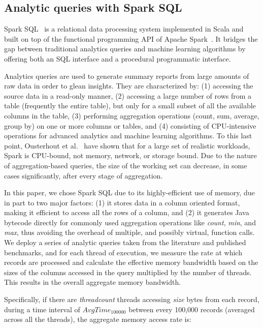 \documentclass[9pt]{sig-alternate-05-2015}
\begin{document}
\subsection{Analytic queries with Spark SQL}
\label{sec:sparksql}

Spark SQL~\cite{Armbrust:2015:SSR:2723372.2742797} is a relational data
processing system implemented in Scala and built on top of the functional
programming API of Apache Spark~\cite{Zaharia:2010:SCC:1863103.1863113}. It
bridges the gap between traditional analytics queries and machine
learning algorithms by offering both an SQL interface and a procedural
programmatic interface.

Analytics queries are used to generate summary reports from large amounts of
raw data in order to glean insights. They are characterized by: (1) accessing
the source data in a read-only manner, (2) accessing a large number of rows
from a table (frequently the entire table), but only for a small subset of all
the available columns in the table, (3) performing aggregation operations
(count, sum, average, group by) on one or more columns or tables, and (4)
consisting of CPU-intensive operations for advanced analytics and machine
learning algorithms.  To this last point, Ousterhout et
al.~\cite{Ousterhout:2015:MSP:2789770.2789791} have shown that for a large set
of realistic workloads, Spark is CPU-bound, not memory, network, or storage
bound.  Due to the nature of aggregation-based queries, the size of the working
set can decrease, in some cases significantly, after every stage of
aggregation.

In this paper, we chose Spark SQL due to its highly-efficient use of memory,
due in part to two major factors: (1) it stores data in a column oriented
format, making it efficient to access all the rows of a column, and (2) it
generates Java bytecode directly for commonly used aggregation operations like
{\em count}, {\em min}, and {\em max}, thus avoiding the overhead of multiple,
and possibly virtual, function calls.  We deploy a series of analytic queries
taken from the literature and published benchmarks, and for each thread of
execution, we measure the rate at which records are processed and calculate the
effective memory bandwidth based on the sizes of the columns accessed in the
query multiplied by the number of threads.  This results in the overall
aggregate memory bandwidth.

Specifically, if there are {\em threadcount} threads accessing {\em size} bytes
from each record, during a time interval of $AvgTime_{100000}$ between every
100,000 records (averaged across all the threads), the aggregate memory access
rate is:
\end{document}
